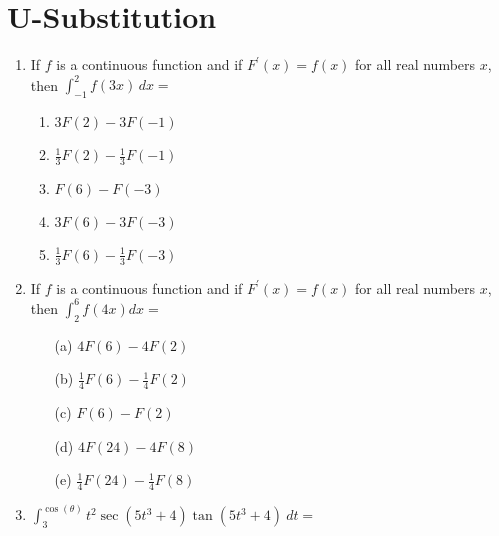 \documentclass[12pt]{report}
\begin{document}
\newcommand{\less}{\textless}
\newcommand{\greater}{\textgreater}
\newcommand{\reals}{\mathbb{R}}
\newcommand{\integers}{\mathbb{Z}}
\newcommand{\rationals}{\mathbb{Q}}
\newcommand{\dsp}{\displaystyle}



\section*{U-Substitution}

\begin{enumerate}

\item If $f$ is a continuous function and if $F^\prime(x) = f(x)$ for all real numbers $x$, then $\int_{-1}^2 f(3x)\,dx =$

\begin{enumerate}

\item $3F(2) - 3F(-1)$

\item $\frac{1}{3}F(2) - \frac{1}{3}F(-1)$

\item $F(6) - F(-3)$

\item $3F(6) - 3F(-3)$

\item $\frac{1}{3}F(6) - \frac{1}{3}F(-3)$

\end{enumerate}

\item If $f$ is a continuous function and if $F^\prime(x) = f(x)$ for all real numbers $x$, then $\dsp \int_{2}^6 f(4x)dx = $
\vspace{0.2cm}
\begin{enumerate}
\item[(a)] $4F(6) - 4F(2)$ \vspace{0.2cm}
\item[(b)] $\dsp \frac{1}{4}F(6) - \frac{1}{4}F(2)$ \vspace{0.2cm}
\item[(c)] $F(6) - F(2)$ \vspace{0.2cm}
\item[(d)] $4F(24) - 4F(8)$ \vspace{0.2cm}
\item[(e)] $\dsp \frac{1}{4}F(24) - \frac{1}{4}F(8)$
\end{enumerate}

\item $\displaystyle \int_3^{\cos(\theta)}t^2\sec(5t^3+4)\tan(5t^3+4)\ dt =$


\end{enumerate}
\end{document}
